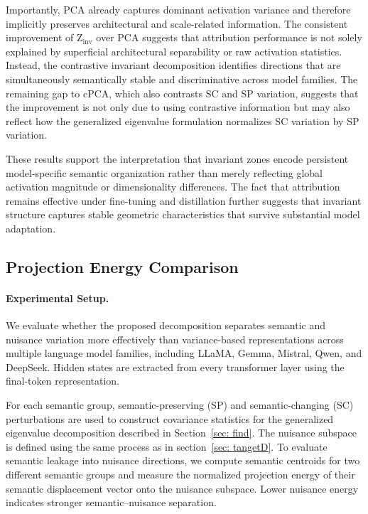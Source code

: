Importantly, PCA already captures dominant activation variance and therefore implicitly preserves architectural and scale-related information.
The consistent improvement of Z$_{\mathrm{inv}}$ over PCA suggests that attribution performance is not solely explained by superficial architectural separability or raw activation statistics. Instead, the contrastive invariant decomposition identifies directions that are simultaneously semantically stable and discriminative across model families.
The remaining gap to cPCA, which also contrasts SC and SP variation, suggests that the improvement is not only due to using contrastive information but may also reflect how the generalized eigenvalue formulation normalizes SC variation by SP variation. %

These results support the interpretation that invariant zones encode persistent model-specific semantic organization rather than merely reflecting global activation magnitude or dimensionality differences. The fact that attribution remains effective under fine-tuning and distillation further suggests that invariant structure captures stable geometric characteristics that survive substantial model adaptation.

\subsection{Projection Energy Comparison}
\label{app:projection_comparison}

\paragraph{Experimental Setup.}
We evaluate whether the proposed decomposition separates semantic and nuisance variation more effectively than variance-based representations across multiple language model families, including LLaMA, Gemma, Mistral, Qwen, and DeepSeek. Hidden states are extracted from every transformer layer using the final-token representation.

For each semantic group, semantic-preserving (SP) and semantic-changing (SC) perturbations are used to construct covariance statistics for the generalized eigenvalue decomposition described in Section~\ref{sec: find}. The nuisance subspace is defined using the same process as in section~\ref{sec: tangetD}. To evaluate semantic leakage into nuisance directions, we compute semantic centroids for two different semantic groups and measure the normalized projection energy of their semantic displacement vector onto the nuisance subspace. Lower nuisance energy indicates stronger semantic--nuisance separation.

